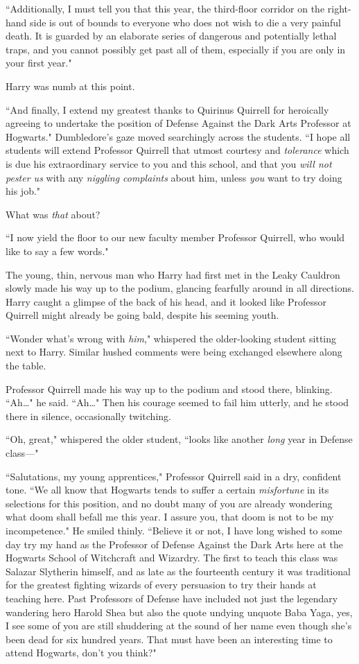 ``Additionally, I must tell you that this year, the third-floor corridor on the right-hand side is out of bounds to everyone who does not wish to die a very painful death. It is guarded by an elaborate series of dangerous and potentially lethal traps, and you cannot possibly get past all of them, especially if you are only in your first year."

Harry was numb at this point.

``And finally, I extend my greatest thanks to Quirinus Quirrell for heroically agreeing to undertake the position of Defense Against the Dark Arts Professor at Hogwarts." Dumbledore's gaze moved searchingly across the students. ``I hope all students will extend Professor Quirrell that utmost courtesy and \emph{tolerance} which is due his extraordinary service to you and this school, and that you \emph{will not pester us} with any \emph{niggling complaints} about him, unless \emph{you} want to try doing his job."

What was \emph{that} about?

``I now yield the floor to our new faculty member Professor Quirrell, who would like to say a few words."

The young, thin, nervous man who Harry had first met in the Leaky Cauldron slowly made his way up to the podium, glancing fearfully around in all directions. Harry caught a glimpse of the back of his head, and it looked like Professor Quirrell might already be going bald, despite his seeming youth.

``Wonder what's wrong with \emph{him}," whispered the older-looking student sitting next to Harry. Similar hushed comments were being exchanged elsewhere along the table.

Professor Quirrell made his way up to the podium and stood there, blinking. ``Ah{\ldots}" he said. ``Ah{\ldots}" Then his courage seemed to fail him utterly, and he stood there in silence, occasionally twitching.

``Oh, great," whispered the older student, ``looks like another \emph{long} year in Defense class—"

``Salutations, my young apprentices," Professor Quirrell said in a dry, confident tone. ``We all know that Hogwarts tends to suffer a certain \emph{misfortune} in its selections for this position, and no doubt many of you are already wondering what doom shall befall me this year. I assure you, that doom is not to be my incompetence." He smiled thinly. ``Believe it or not, I have long wished to some day try my hand as the Professor of Defense Against the Dark Arts here at the Hogwarts School of Witchcraft and Wizardry. The first to teach this class was Salazar Slytherin himself, and as late as the fourteenth century it was traditional for the greatest fighting wizards of every persuasion to try their hands at teaching here. Past Professors of Defense have included not just the legendary wandering hero Harold Shea but also the quote undying unquote Baba Yaga, yes, I see some of you are still shuddering at the sound of her name even though she's been dead for six hundred years. That must have been an interesting time to attend Hogwarts, don't you think?"

